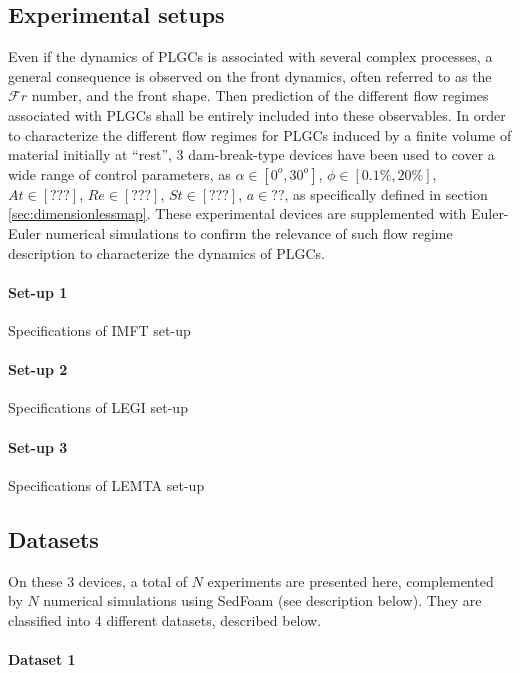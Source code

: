 \documentclass[twocolumn]{article}
\begin{document}
\subsection{Experimental setups}

Even if the dynamics of PLGCs is associated with several complex processes, a general consequence is observed on the front dynamics, often referred to as the $\mathcal{F}r$ number, and the front shape. Then prediction of the different flow regimes associated with PLGCs shall be entirely included into these observables. In order to characterize the different flow regimes for PLGCs induced by a finite volume of material initially at “rest”, 3 dam-break-type devices have been used to cover a wide range of control parameters, as $\alpha \in [0^o,30^o]$, $\phi\in[0.1\%,20\%]$, $At\in[???]$, $Re\in[???]$, $St\in[???]$, $a\in??$, as specifically defined in section \ref{sec:dimensionlessmap}. These experimental devices are supplemented with Euler-Euler numerical simulations to confirm the relevance of such flow regime description to characterize the dynamics of PLGCs.

\paragraph{Set-up 1}

Specifications of IMFT set-up

\paragraph{Set-up 2}

Specifications of LEGI set-up

\paragraph{Set-up 3}

Specifications of LEMTA set-up

\subsection{Datasets}

On these 3 devices, a total of $N$ experiments are presented here, complemented by $N$ numerical simulations using SedFoam (see description below). They are classified into 4 different datasets, described below.

\paragraph{Dataset 1}
\end{document}
